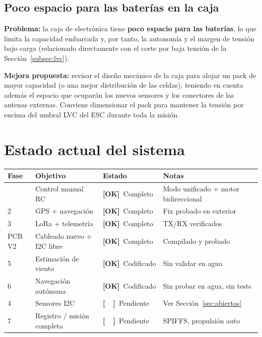 \documentclass[12pt,a4paper]{article}
\newcommand{\done}{\textcolor{okborder}{\textbf{[OK]}}}
\newcommand{\todo}{\textcolor{warnborder}{\textbf{[\ \ ]}}}
\begin{document}
\subsection{Poco espacio para las bater\'ias en la caja}

\begin{warningbox}
  \textbf{Problema:} la caja de electr\'onica tiene \textbf{poco espacio para las
  bater\'ias}, lo que limita la capacidad embarcada y, por tanto, la autonom\'ia y
  el margen de tensi\'on bajo carga (relacionado directamente con el corte por baja
  tensi\'on de la Secci\'on~\ref{subsec:lvc}).
\end{warningbox}

\begin{okbox}
  \textbf{Mejora propuesta:} revisar el dise\~no mec\'anico de la caja para alojar
  un pack de mayor capacidad (o una mejor distribuci\'on de las celdas), teniendo
  en cuenta adem\'as el espacio que ocupar\'an los nuevos sensores y los conectores
  de las antenas externas. Conviene dimensionar el pack para mantener la tensi\'on
  por encima del umbral LVC del ESC durante toda la misi\'on.
\end{okbox}

\section{Estado actual del sistema}

\begin{longtable}{C{1.4cm} L{5.3cm} C{2.6cm} L{3.6cm}}
  \toprule
  \textcolor{tableheadfg}{\textbf{Fase}} &
  \textcolor{tableheadfg}{\textbf{Objetivo}} &
  \textcolor{tableheadfg}{\textbf{Estado}} &
  \textcolor{tableheadfg}{\textbf{Notas}} \\
  \midrule
  \endhead
  \bottomrule
   & Control manual RC & \done\ Completo & Modo unificado + motor bidireccional \\[3pt]
  2 & GPS + navegaci\'on & \done\ Completo & Fix probado en exterior \\[3pt]
  3 & LoRa + telemetr\'ia & \done\ Completo & TX/RX verificados \\[3pt]
  PCB V2 & Cableado nuevo + I2C libre & \done\ Completo & Compilado y probado \\[3pt]
  5 & Estimaci\'on de viento & \done\ Codificado & Sin validar en agua \\[3pt]
  6 & Navegaci\'on aut\'onoma & \done\ Codificado & Sin probar en agua, sin tests \\[3pt]
  4 & Sensores I2C & \todo\ Pendiente & Ver Secci\'on~\ref{sec:abiertos} \\[3pt]
  7 & Registro / misi\'on completa & \todo\ Pendiente & SPIFFS, propulsi\'on auto \\
\end{longtable}
\end{document}
